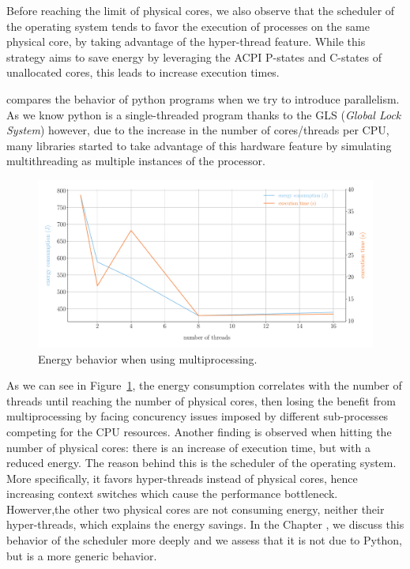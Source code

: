 Before reaching the limit of physical cores, we also observe that the scheduler of the operating system tends to favor the execution of processes on the same physical core, by taking advantage of the hyper-thread feature.
While this strategy aims to save energy by leveraging the ACPI P-states and C-states of unallocated cores, this leads to increase execution times.



 compares the behavior of python programs when we try to introduce parallelism.
As we know python is a single-threaded program thanks to the GLS (\emph{Global Lock System}) however, due to the increase in the number of cores/threads per CPU, many libraries started to take advantage of this hardware feature by simulating multithreading as multiple instances of the processor. %

\begin{figure}[hbt]
    \centering
    \includegraphics[width=\linewidth]{imgs/multiprocessing_energyvstime}
    \caption{Energy behavior when using multiprocessing.}
    \label{fig:python_multiprocessing}
\end{figure}

As we can see in Figure~\ref{fig:python_multiprocessing}, the energy consumption correlates with the number of threads until reaching the number of physical cores, then losing the benefit from multiprocessing by facing concurency issues imposed by different sub-processes competing for the CPU resources.
Another finding is observed when hitting the number of physical cores: there is an increase of execution time, but with a reduced energy.
The reason behind this is the scheduler of the operating system.
More specifically, it favors hyper-threads instead of physical cores, hence increasing context switches which cause the performance bottleneck.
Howerver,the other two physical cores are not consuming energy, neither their hyper-threads, which explains the energy savings.
In the Chapter , %
we discuss this behavior of the scheduler more deeply and we assess that it is not due to Python, but is a more generic behavior. %

